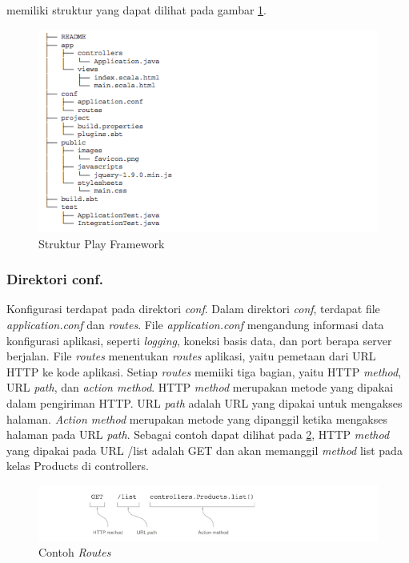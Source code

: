 \play memiliki struktur yang dapat dilihat pada gambar \ref{fig:2_play_struktur}.

\begin{figure}[H]
	\centering
	\includegraphics[scale=0.7]{Gambar/play-struktur}
	\caption{Struktur Play Framework} 
	\label{fig:2_play_struktur}
\end{figure}

\subsubsection{Direktori conf.}
Konfigurasi \play terdapat pada direktori \textit{conf}. Dalam direktori \textit{conf}, terdapat file \textit{application.conf} dan \textit{routes}. File \textit{application.conf} mengandung informasi data konfigurasi aplikasi, seperti \textit{logging}, koneksi basis data, dan port berapa server berjalan. File \textit{routes} menentukan \textit{routes} aplikasi, yaitu pemetaan dari URL HTTP ke kode aplikasi. Setiap \textit{routes} memiiki tiga bagian, yaitu HTTP \textit{method}, URL \textit{path}, dan \textit{action method}. HTTP \textit{method} merupakan metode yang dipakai dalam pengiriman HTTP. URL \textit{path} adalah URL yang dipakai untuk mengakses halaman. \textit{Action method} merupakan metode  yang dipanggil ketika mengakses halaman pada URL \textit{path}. Sebagai contoh dapat dilihat pada \ref{fig:2_play_routes}, HTTP \textit{method} yang dipakai pada URL /list adalah GET dan akan memanggil \textit{method} list pada kelas Products di controllers.

\begin{figure}[H]
	\centering
	\includegraphics[scale=0.7]{Gambar/play-routes}
	\caption{Contoh \textit{Routes}} 
	\label{fig:2_play_routes}
\end{figure}

